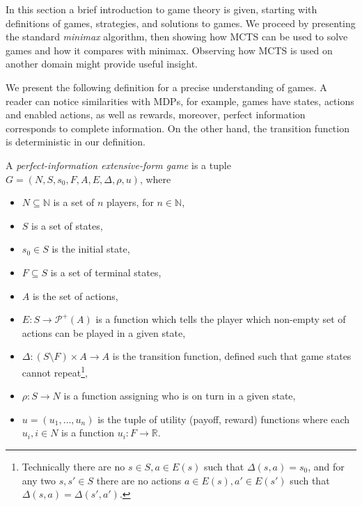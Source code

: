 In this section a brief introduction to game theory is given, starting
with definitions of games, strategies, and solutions to games. We
proceed by presenting the standard {\em minimax} algorithm, then showing
how MCTS can be used to solve games and how it compares with minimax.
Observing how MCTS is used on another domain might provide useful insight.

We present the following definition for a precise understanding of games.
A reader can notice similarities with MDPs, for
example, games have states, actions and enabled actions, as well as
rewards, moreover, perfect information corresponds to complete
information. On the other hand, the transition function is
deterministic in our definition.

\begin{definition}
    A {\em perfect-information extensive-form game}
    is a tuple $G = (N, S, s_0, F, A, E, \Delta, \rho, u)$,
    where
    \begin{itemize}
        \item $N \subseteq \mathbb{N}$ is a set of $n$ players,
            for $n \in \mathbb{N}$,
        \item $S$ is a set of states,
        \item $s_0 \in S$ is the initial state,
        \item $F \subseteq S$ is a set of terminal states,
        \item $A$ is the set of actions,
        \item $E : S \to \mathcal{P}^+(A)$ is a function which tells the player
            which non-empty set of actions can be played in a given state,
        \item $\Delta : (S \setminus F) \times A \to A$ is the
            transition function, defined such that game states cannot
            repeat\footnote{
                Technically there are no $s \in S, a \in E(s)$ such that
                $\Delta(s,a) = s_0$, and for any two $s,s' \in S$ there
                are no actions $a \in E(s), a' \in E(s')$ such that
                $\Delta(s,a) = \Delta(s',a')$.
            },
        \item $\rho : S \to N$ is a function assigning who is on turn in
            a given state, %
        \item $u = (u_1,\ldots,u_{n})$ is the tuple of
            utility (payoff, reward) functions where each $u_i, i \in N$
            is a function $u_i : F \to \mathbb{R}$.
    \end{itemize}
\end{definition}

